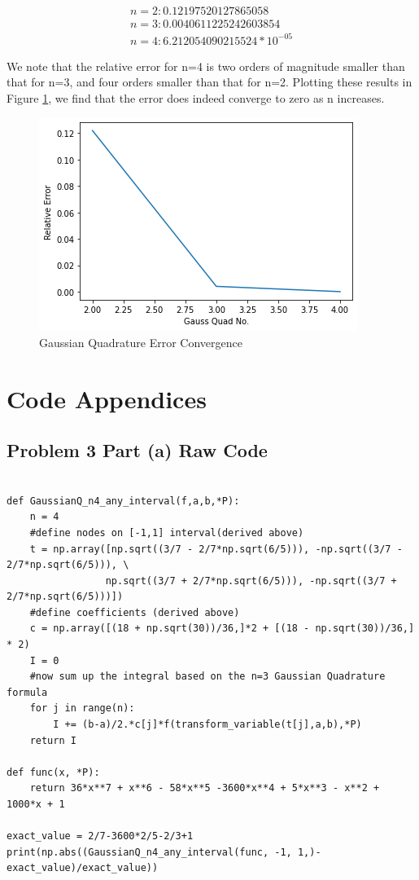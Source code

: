 \documentclass{article}
\begin{document}
\begin{gather*}
n = 2 : 0.12197520127865058 \\
n = 3 : 0.0040611225242603854 \\
n = 4 : 6.212054090215524*10^{-05}
\end{gather*}

We note that the relative error for n=4 is two orders of magnitude smaller than that for n=3, and four orders smaller than that for n=2.
Plotting these results in Figure \ref{fig:4}, we find that the error does indeed converge to zero as n increases.

\begin{figure}
  \includegraphics[width=\textwidth]{index.png}
  \caption{Gaussian Quadrature Error Convergence}
  \label{fig:4}
\end{figure}

\appendix
\section{Code Appendices}
\subsection{Problem 3 Part (a) Raw Code}\label{appendix:a}

\begin{verbatim}

def GaussianQ_n4_any_interval(f,a,b,*P):
    n = 4
    #define nodes on [-1,1] interval(derived above)
    t = np.array([np.sqrt((3/7 - 2/7*np.sqrt(6/5))), -np.sqrt((3/7 - 2/7*np.sqrt(6/5))), \
                 np.sqrt((3/7 + 2/7*np.sqrt(6/5))), -np.sqrt((3/7 + 2/7*np.sqrt(6/5)))])
    #define coefficients (derived above)
    c = np.array([(18 + np.sqrt(30))/36,]*2 + [(18 - np.sqrt(30))/36,] * 2)
    I = 0
    #now sum up the integral based on the n=3 Gaussian Quadrature formula
    for j in range(n):
        I += (b-a)/2.*c[j]*f(transform_variable(t[j],a,b),*P)
    return I
    
def func(x, *P):
    return 36*x**7 + x**6 - 58*x**5 -3600*x**4 + 5*x**3 - x**2 + 1000*x + 1
    
exact_value = 2/7-3600*2/5-2/3+1
print(np.abs((GaussianQ_n4_any_interval(func, -1, 1,)-exact_value)/exact_value))
\end{verbatim}
\end{document}
